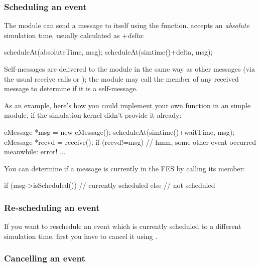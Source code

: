 \subsubsection{Scheduling an event}

The module can send a message to itself using the  function.
 accepts an \textit{absolute} simulation time,
usually calculated as +\textit{delta}:

\begin{cpp}
scheduleAt(absoluteTime, msg);
scheduleAt(simtime()+delta, msg);
\end{cpp}

Self-messages are delivered to the module in the same way as other
messages (via the usual receive calls or );
the module may call the  member of any received
message to determine if it is a self-message.

As an example, here's how you could implement your own 
function in an  simple module, if the simulation kernel
didn't provide it already:

%
%

\begin{cpp}
cMessage *msg = new cMessage();
scheduleAt(simtime()+waitTime, msg);
cMessage *recvd = receive();
if (recvd!=msg)
   // hmm, some other event occurred meanwhile: error!
...
\end{cpp}

You can determine if a message is currently in the FES
by calling its  member:

\begin{cpp}
if (msg->isScheduled())
  // currently scheduled
else
  // not scheduled
\end{cpp}


\subsubsection{Re-scheduling an event}

If you want to reschedule an event which is currently scheduled to a different
simulation time, first you have to cancel it using .


\subsubsection{Cancelling an event}

